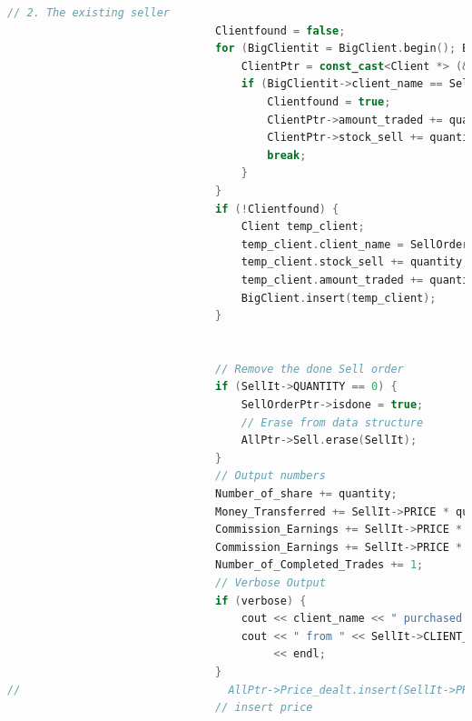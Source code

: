 \documentclass{article}
\begin{document}
\begin{lstlisting}[language=C++]
                                // 2. The existing seller
                                Clientfound = false;
                                for (BigClientit = BigClient.begin(); BigClientit != BigClient.end(); BigClientit++) {
                                    ClientPtr = const_cast<Client *> (&(*BigClientit));
                                    if (BigClientit->client_name == SellOrderPtr->CLIENT_NAME) {
                                        Clientfound = true;
                                        ClientPtr->amount_traded += quantity * SellIt->PRICE;
                                        ClientPtr->stock_sell += quantity;
                                        break;
                                    }
                                }
                                if (!Clientfound) {
                                    Client temp_client;
                                    temp_client.client_name = SellOrderPtr->CLIENT_NAME;
                                    temp_client.stock_sell += quantity;
                                    temp_client.amount_traded += quantity * SellIt->PRICE;
                                    BigClient.insert(temp_client);
                                }


                                // Remove the done Sell order
                                if (SellIt->QUANTITY == 0) {
                                    SellOrderPtr->isdone = true;
                                    // Erase from data structure
                                    AllPtr->Sell.erase(SellIt);
                                }
                                // Output numbers
                                Number_of_share += quantity;
                                Money_Transferred += SellIt->PRICE * quantity;
                                Commission_Earnings += SellIt->PRICE * quantity / 100;
                                Commission_Earnings += SellIt->PRICE * quantity / 100;
                                Number_of_Completed_Trades += 1;
                                // Verbose Output
                                if (verbose) {
                                    cout << client_name << " purchased " << quantity << " shares of " << equity_symbol;
                                    cout << " from " << SellIt->CLIENT_NAME << " for $" << SellIt->PRICE << "/share"
                                         << endl;
                                }
//                                AllPtr->Price_dealt.insert(SellIt->PRICE);
                                // insert price


\end{lstlisting}
\end{document}
